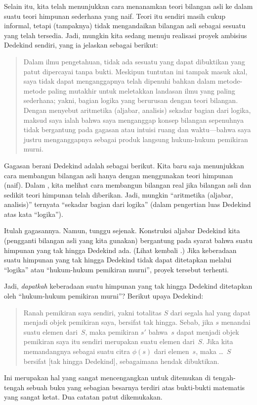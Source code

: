 \documentclass[../../../include/open-logic-section]{subfiles}
\begin{document}
Selain itu, kita telah menunjukkan cara menanamkan teori bilangan asli ke
dalam suatu teori himpunan sederhana yang naif. Teori itu sendiri masih
cukup informal, tetapi (tampaknya) tidak mengandaikan bilangan asli sebagai
sesuatu yang telah tersedia. Jadi, mungkin kita sedang menuju realisasi
proyek ambisius Dedekind sendiri, yang ia jelaskan sebagai berikut:
\begin{quote}
	Dalam ilmu pengetahuan, tidak ada sesuatu yang dapat dibuktikan yang patut
	dipercayai tanpa bukti. Meskipun tuntutan ini tampak masuk akal, saya tidak
	dapat menganggapnya telah dipenuhi bahkan dalam metode-metode paling
	mutakhir untuk meletakkan landasan ilmu yang paling sederhana; yakni,
	bagian logika yang berurusan dengan teori bilangan. Dengan menyebut
	aritmetika (aljabar, analisis) sekadar bagian dari logika, maksud saya ialah
	bahwa saya menganggap konsep bilangan sepenuhnya tidak bergantung pada
	gagasan atau intuisi ruang dan waktu---bahwa saya justru menganggapnya
	sebagai produk langsung hukum-hukum pemikiran murni.
	\citep[preface]{Dedekind1888}
\end{quote}
Gagasan berani Dedekind adalah sebagai berikut. Kita baru saja menunjukkan
cara membangun bilangan asli hanya dengan menggunakan teori himpunan (naif).
Dalam , kita melihat cara membangun bilangan real
jika bilangan asli dan sedikit teori himpunan telah diberikan. Jadi, mungkin
``aritmetika (aljabar, analisis)'' ternyata ``sekadar bagian dari logika''
(dalam pengertian luas Dedekind atas kata ``logika'').

Itulah gagasannya. Namun, tunggu sejenak. Konstruksi aljabar Dedekind kita
(pengganti bilangan asli yang kita gunakan) bergantung pada syarat bahwa
suatu himpunan yang tak hingga Dedekind ada. (Lihat kembali
.) Jika
keberadaan suatu himpunan yang tak hingga Dedekind tidak dapat ditetapkan
melalui ``logika'' atau ``hukum-hukum pemikiran murni'', proyek tersebut
terhenti.

Jadi, \emph{dapatkah} keberadaan suatu himpunan yang tak hingga Dedekind
ditetapkan oleh ``hukum-hukum pemikiran murni''? Berikut upaya Dedekind:
\begin{quote}
  Ranah pemikiran saya sendiri, yakni totalitas $S$ dari segala hal yang
  dapat menjadi objek pemikiran saya, bersifat tak hingga. Sebab, jika $s$
  menandai suatu elemen dari~$S$, maka pemikiran $s'$ bahwa~$s$ dapat menjadi
  objek pemikiran saya itu sendiri merupakan suatu elemen dari~$S$. Jika kita
  memandangnya sebagai suatu citra $\phi(s)$ dari elemen~$s$, maka
  \dots~$S$ bersifat [tak hingga Dedekind], sebagaimana hendak dibuktikan.
	\citep[\S66]{Dedekind1888}
\end{quote}
Ini merupakan hal yang sangat mencengangkan untuk ditemukan di tengah-tengah
sebuah buku yang sebagian besarnya terdiri atas bukti-bukti matematis yang
sangat ketat. Dua catatan patut dikemukakan.
\end{document}
